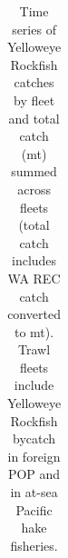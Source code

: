 \documentclass[
]{scrartcl}
\begin{document}
\endgroup

\newpage{}

\begin{landscape}
\begingroup
\fontsize{9.0pt}{10.8pt}\selectfont

\begin{longtable}{>{\raggedleft\arraybackslash}p{\dimexpr 56.25pt -2\tabcolsep-1.5\arrayrulewidth}>{\raggedleft\arraybackslash}p{\dimexpr 56.25pt -2\tabcolsep-1.5\arrayrulewidth}>{\raggedleft\arraybackslash}p{\dimexpr 56.25pt -2\tabcolsep-1.5\arrayrulewidth}>{\raggedleft\arraybackslash}p{\dimexpr 56.25pt -2\tabcolsep-1.5\arrayrulewidth}>{\raggedleft\arraybackslash}p{\dimexpr 56.25pt -2\tabcolsep-1.5\arrayrulewidth}>{\raggedleft\arraybackslash}p{\dimexpr 56.25pt -2\tabcolsep-1.5\arrayrulewidth}>{\raggedleft\arraybackslash}p{\dimexpr 56.25pt -2\tabcolsep-1.5\arrayrulewidth}>{\raggedleft\arraybackslash}p{\dimexpr 56.25pt -2\tabcolsep-1.5\arrayrulewidth}>{\raggedleft\arraybackslash}p{\dimexpr 56.25pt -2\tabcolsep-1.5\arrayrulewidth}}

\caption{\label{tbl-all_removals}Time series of Yelloweye Rockfish
catches by fleet and total catch (mt) summed across fleets (total catch
includes WA REC catch converted to mt). Trawl fleets include Yelloweye
Rockfish bycatch in foreign POP and in at-sea Pacific hake fisheries.}

\tabularnewline


\end{longtable}
\end{landscape}
\end{document}
